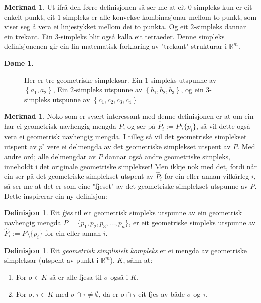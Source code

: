 \documentclass[a4paper, titlepage, 12pt, norsk]{article}
\theoremstyle{plain}
\theoremstyle{definition}
\newtheorem{definition}[theorem]{Definisjon}
\newtheorem{example}[theorem]{Døme}
\newtheorem{remark}[theorem]{Merknad}
\newcommand{\Rb}{\mathbb{R}}
\newcommand{\intersect}{ \mathop{\cap}\limits } %
\newcommand{\set}[1]{ \left \{ #1 \right \} } %
\begin{document}
\begin{remark}
	Ut ifrå den førre definisjonen så ser me at eit $0$-simpleks kun er eit enkelt punkt, eit $1$-simpleks er alle konvekse kombinasjonar mellom to punkt, som viser seg å vera ei linjestykket mellom dei to punkta. Og eit $2$-simpleks dannar ein trekant. Ein $3$-simpleks blir også kalla eit tetraeder. Denne simpleks definisjonenen gir ein fin matematisk forklaring av "trekant"-strukturar i $\Rb^m$.
\end{remark}

\begin{example}
	\phantom{123}
	\begin{figure}[htbp]
		\begin{center}
			
			\caption{Her er tre geometriske simpleksar. Ein \( 1 \)-simpleks utspunne av \( \set{a_1, a_2} \), Ein \(2\)-simpleks utspunne av \( \set{b_1, b_2, b_3} \), og ein \(3\)-simpleks utspunne av \( \set{c_1, c_2, c_3, c_4} \)}
		\end{center}
	\end{figure}
\end{example}

\begin{remark}
	Noko som er svært interessant med denne definisjonen er at om ein har ei geometrisk uavhengig mengda $P$, og ser på $\hat{P}_i := P \setminus \{p_i\}$, så vil dette også vera ei geometrisk uavhengig mengda. I tilleg så vil det geometriske simplekset utspent av $p^i$ vere ei delmengda av det geometriske simplekset utspent av $P$. Med andre ord; alle delmengdar av $P$ dannar også andre geometriske simpleks, inneholdt i det originale geometriske simplekset! Men ikkje nok med det, fordi når ein ser på det geometriske simplekset utspent av $\hat{P}_i$ for ein eller annan vilkårleg $i$, så ser me at det er som eine "fjeset" av det geometriske simplekset utspunne av $P$. Dette inspirerar ein ny definisjon:
\end{remark}

\begin{definition}
	Eit \emph{fjes} til eit geometrisk simpleks utspunne av ein geometrisk uavhengig mengda $P=\{p_1, p_2, p_3, \dots, p_n\}$, er eit geometriske simpleks utspunne av $\hat{P}_i := P\setminus \{p_i\}$ for ein eller annan $i$.
\end{definition}

\begin{definition} %
	Eit \emph{geometrisk simplisielt kompleks} er ei mengda av geometriske simpleksar (utspent av punkt i $\Rb^m$), $K$, sånn at:
	\begin{enumerate}
		\item{For $\sigma \in K$ så er alle fjesa til $\sigma$ også i $K$.}
		\item{For $\sigma, \tau \in K$ med $\sigma \intersect \tau \neq \emptyset$, då er $\sigma \intersect \tau$ eit fjes av både $\sigma$ og $\tau$.}
	\end{enumerate}
\end{definition}
\end{document}
